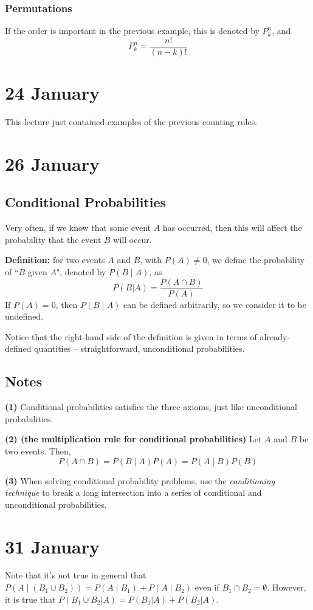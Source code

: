 \documentclass[12pt]{article}
\begin{document}
\subsubsection{Permutations}
If the order is important in the previous example, this is denoted by $P_k^n$, and
\[
    P_k^n = \frac{n!}{(n-k)!}
\]

\section{24 January}
This lecture just contained examples of the previous counting rules.

\section{26 January}
\subsection{Conditional Probabilities}
Very often, if we know that some event $A$ has occurred, then this will affect the probability that the event $B$ will occur.

\textbf{Definition:} for two events $A$ and $B$, with $P(A) \neq 0$, we define the probability of ``$B$ given $A$", denoted by $P(B \; | \; A)$, as
\[
    P(B|A) = \frac{P(A \cap B)}{P(A)}
\]
If $P(A) = 0$, then $P(B \; | \; A)$ can be defined arbitrarily, so we consider it to be undefined.

Notice that the right-hand side of the definition is given in terms of already-defined quantities -- straightforward, unconditional probabilities. 

\subsection{Notes}
\textbf{(1)} Conditional probabilities satisfies the three axioms, just like unconditional probabilities.

\textbf{(2) (the multiplication rule for conditional probabilities)} Let $A$ and $B$ be two events. Then,
\[
    P(A \cap B) = P(B \; | \; A) P(A) = P(A \; | \; B) P(B)
\]

\textbf{(3)} When solving conditional probability problems, use the \emph{conditioning technique} to break a long intersection into a series of conditional and unconditional probabilities.

\section{31 January} 
Note that it's not true in general that $P(A \; | \; (B_1 \cup B_2)) = P(A \; | \; B_1) + P(A \; | \; B_2)$ even if $B_1 \cap B_2 = \emptyset$. However, it is true that $P(B_1 \cup B_2 | A) = P(B_1 | A) + P(B_2 | A)$.
\end{document}
